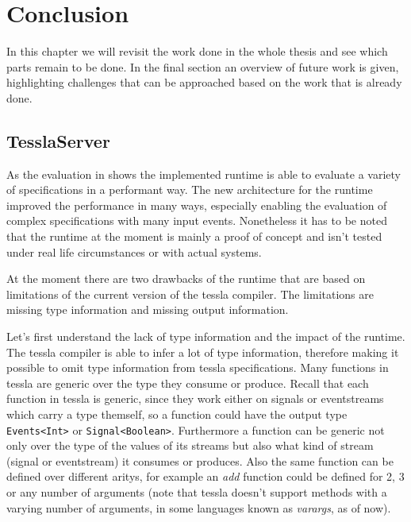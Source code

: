 %
\chapter{Conclusion}
\label{sec:conclusion}

In this chapter we will revisit the work done in the whole thesis and see which parts remain to be done.
In the final section an overview of future work is given, highlighting challenges that can be approached based on the work that is already done.

\section{TesslaServer}

As the evaluation in  shows the implemented runtime is able to evaluate a variety of specifications in a performant way.
The new architecture for the runtime improved the performance in many ways, especially enabling the evaluation of complex specifications with many input events.
Nonetheless it has to be noted that the runtime at the moment is mainly a proof of concept and isn't tested under real life circumstances or with actual systems.

At the moment there are two drawbacks of the runtime that are based on limitations of the current version of the \gls{tessla} compiler.
The limitations are missing type information and missing output information.

Let's first understand the lack of type information and the impact of the runtime.
The \gls{tessla} compiler is able to infer a lot of type information, therefore making it possible to omit type information from \gls{tessla} specifications.
Many functions in \gls{tessla} are generic over the type they consume or produce.
Recall that each function in \gls{tessla} is generic, since they work either on signals or eventstreams which carry a type themself, so a function could have the output type \lstinline{Events<Int>} or \lstinline{Signal<Boolean>}.
Furthermore a function can be generic not only over the type of the values of its streams but also what kind of stream (signal or eventstream) it consumes or produces.
Also the same function can be defined over different aritys, for example an \emph{add} function could be defined for 2, 3 or any number of arguments (note that \gls{tessla} doesn't support methods with a varying number of arguments, in some languages known as \emph{varargs}, as of now).

